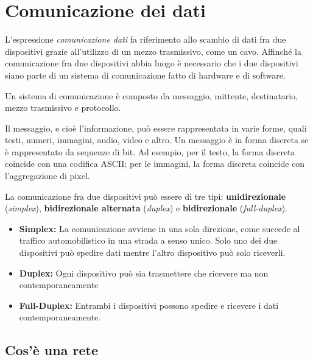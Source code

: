\section{Comunicazione dei dati}

L’espressione \textit{comunicazione dati} fa riferimento allo scambio di dati fra due
dispositivi grazie all’utilizzo di un mezzo trasmissivo, come un cavo. Affinché la comunicazione fra due dispositivi abbia luogo è necessario che i due dispositivi siano parte di un sistema di comunicazione fatto di hardware e di software.

\vspace{3mm}

Un sistema di comunicazione è composto da messaggio, mittente, destinatario, mezzo trasmissivo e protocollo.

\vspace{3mm}

Il messaggio, e cioè l'informazione, può essere rappresentata in varie forme, quali testi, numeri, immagini, audio, video e altro. Un messaggio è in forma discreta se è rappresentato da sequenze di bit. Ad esempio, per il testo, la forma discreta coincide con una codifica ASCII; per le immagini, la forma discreta coincide con l'aggregazione di pixel.

\vspace{3mm}

La comunicazione fra due dispositivi può essere di tre tipi: \textbf{unidirezionale} (\textit{simplex}), \textbf{bidirezionale alternata} (\textit{duplex}) e \textbf{bidirezionale} (\textit{full-duplex}).

\begin{itemize}
    \item 
    \textbf{Simplex:} La comunicazione avviene in una sola direzione, come succede al traffico automobilistico in una strada a senso unico. Solo uno dei due dispositivi può spedire dati mentre l’altro dispositivo può solo riceverli.

    \item
    \textbf{Duplex:} Ogni dispositivo può sia trasmettere che ricevere ma non contemporaneamente
    
    \item
    \textbf{Full-Duplex:} Entrambi i dispositivi possono spedire e ricevere i dati contemporaneamente.
\end{itemize}

\subsection{Cos'è una rete}

